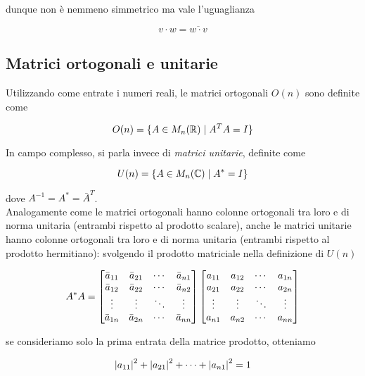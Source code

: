 dunque non è nemmeno simmetrico ma vale l'uguaglianza

\begin{equation}
	v \cdot w = \overline{w \cdot v}
\end{equation}

\subsection{Matrici ortogonali e unitarie}

Utilizzando come entrate i numeri reali, le matrici ortogonali $ O(n) $ sono definite come

\begin{equation}
	O(n) = \{ A \in M_{n}(\mathbb{R}) \mid A^{T} A = I \}
\end{equation}

In campo complesso, si parla invece di \textit{matrici unitarie}, definite come

\begin{equation}
	U(n) = \{ A \in M_{n}(\mathbb{C}) \mid A^{*} = I \}
\end{equation}

dove $ A ^{-1} = A^{*} = \bar{A}^{T} $.\\
Analogamente come le matrici ortogonali hanno colonne ortogonali tra loro e di norma unitaria (entrambi rispetto al prodotto scalare), anche le matrici unitarie hanno colonne ortogonali tra loro e di norma unitaria (entrambi rispetto al prodotto hermitiano): svolgendo il prodotto matriciale nella definizione di $ U(n) $

\begin{equation}
	A^{*} A = %
	\bmqty{ %
			\bar{a}_{11} & \bar{a}_{21} & \cdots & \bar{a}_{n1} \\ %
			\bar{a}_{12} & \bar{a}_{22} & \cdots & \bar{a}_{n2} \\ %
			\vdots & \vdots & \ddots & \vdots \\ %
			\bar{a}_{1n} & \bar{a}_{2n} & \cdots & \bar{a}_{nn}
			}
	\bmqty{ %
			a_{11} & a_{12} & \cdots & a_{1n} \\ %
			a_{21} & a_{22} & \cdots& a_{2n} \\ %
			\vdots & \vdots & \ddots & \vdots \\ %
			a_{n1} & a_{n2} & \cdots & a_{nn}
			}
\end{equation}

se consideriamo solo la prima entrata della matrice prodotto, otteniamo

\begin{equation}
	\abs{a_{11}}^{2} + \abs{a_{21}}^{2} + \cdots + \abs{a_{n1}}^{2} = 1
\end{equation}


